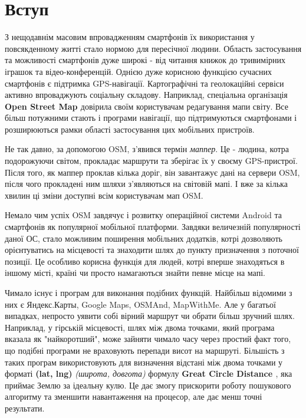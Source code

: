\documentclass[simple,a4paper,14pt,ukrainian,utf8]{eskdtext}
\begin{document}
\tableofcontents

\newpage

  \newpage
  \section*{Вступ}

    З нещодавнім масовим впровадженням смартфонів їх використання у повсякденному житті стало нормою для пересічної людини. Область застосування та можливості смартфонів дуже широкі - від читання книжок до тривимірних іграшок та відео-конференцій. Однією дуже корисною функцією сучасних смартфонів є підтримка GPS-навігації. Картографічні та геолокаційні сервіси активно впроваджують соціальну складову. Наприклад, спеціальна організація \textbf{Open Street Map \cite{website:osm}} довірила своїм користувачам редагування мапи світу. Все більш потужними стають і програми навігації, що підтримуються смартфонами і розширюються рамки області застосування цих мобільних пристроїв.

    Не так давно, за допомогою OSM, з’явився термін \textit{маппер}. Це - людина, котра подорожуючи світом, прокладає маршрути та зберігає їх у своєму GPS-пристрої. Після того, як маппер проклав кілька доріг, він завантажує дані на сервери OSM, після чого прокладені ним шляхи з’являються на світовій мапі. І вже за кілька хвилин ці зміни доступні всім користувачам мап OSM.
    
    Немало чим успіх OSM завдячує і розвитку операційної системи Android та смартфонів як популярної мобільної платформи. Завдяки величезній популярності даної ОС, стало можливим поширення мобільних додатків, котрі дозволяють орієнтуватись на місцевості та знаходити шлях до пункту призначення з поточної позиції. Це особливо корисна функція для людей, котрі вперше знаходяться в іншому місті, країні чи просто намагаються знайти певне місце на мапі.
    
    Чимало існує і програм для виконання подібних функцій. Найбільш відомими з них є Яндекс.Карты, Google Maps, OSMAnd, MapWithMe. Але у багатьої випадках, непросто уявити собі вірний маршрут чи обрати більш зручний шлях. Наприклад, у гірській місцевості, шлях між двома точками, який програма вказала як "найкоротший", може зайняти чимало часу через простий факт того, що подібні програми не враховують перепади висот на маршруті. Більшість з таких програм використовують для визначення відстані між двома точками у форматі \textbf{(lat, lng)} \textit{(широта, довгота)} формулу \textbf{Great Circle Distance \cite{website:great_circle_distance}}, яка приймає Землю за ідеальну кулю. Це дає змогу прискорити роботу пошукового алгоритму та зменшити навантаження на процесор, але дає менш точні результати.
    
\end{document}
